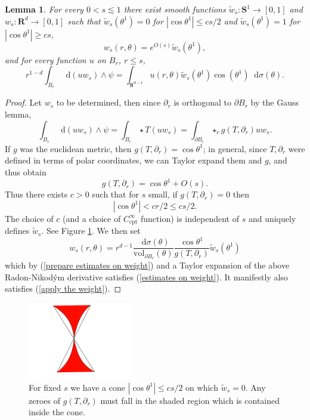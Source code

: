 \documentclass[reqno,12pt,letterpaper]{amsart}
\newcommand{\RR}{\mathbf{R}}
\newcommand{\Sph}{\mathbf S}
\newcommand*\dif{\mathop{}\!\mathrm{d}}
\newcommand{\vol}{\mathrm{vol}}
\newcommand{\cpt}{\mathrm{cpt}}
\newtheorem{lemma}[theorem]{Lemma}
\theoremstyle{definition}
\numberwithin{equation}{section}
\begin{document}
\begin{lemma}\label{monotone weight}
For every $0 < s \lesssim 1$ there exist smooth functions $\tilde w_s: \Sph^1 \to [0, 1]$ and $w_s: \RR^d \to [0, 1]$ such that $\tilde w_s(\theta^1) = 0$ for $|\cos \theta^1| \leq cs/2$ and $\tilde w_s(\theta^1) = 1$ for $|\cos \theta^1| \geq cs$,
\begin{equation}\label{estimates on weight}
w_s(r, \theta) = e^{O(s)} \tilde w_s(\theta^1),
\end{equation}
and for every function $u$ on $B_r$, $r \leq s$,
\begin{equation}\label{apply the weight}
r^{1 - d} \int_{B_r} \dif(uw_s) \wedge \psi = \int_{\Sph^{d - 1}} u(r, \theta) \tilde w_s(\theta^1) \cos(\theta^1) \dif \sigma(\theta).
\end{equation}
\end{lemma}
\begin{proof}
Let $w_s$ to be determined, then since $\partial_r$ is orthogonal to $\partial B_r$ by the Gauss lemma,
$$\int_{B_r} \dif(uw_s) \wedge \psi = \int_{B_r} \star T(uw_s) = \int_{\partial B_r} \star_r g(T, \partial_r) uw_s.$$
If $g$ was the euclidean metric, then $g(T, \partial_r) = \cos \theta^1$; in general, since $T, \partial_r$ were defined in terms of polar coordinates, we can Taylor expand them and $g$, and thus obtain
\begin{equation}\label{prepare estimates on weight}
g(T, \partial_r) = \cos \theta^1 + O(s).
\end{equation}
Thus there exists $c > 0$ such that for $s$ small, if $g(T, \partial_r) = 0$ then
$$|\cos \theta^1| < cr/2 \leq cs/2.$$
The choice of $c$ (and a choice of $C^\infty_\cpt$ function) is independent of $s$ and uniquely defines $\tilde w_s$. See Figure \ref{cutoff diagram}.
We then set 
$$w_s(r, \theta) = r^{d - 1} \frac{\dif \sigma(\theta)}{\vol_{\partial B_r}(\theta)} \frac{\cos \theta^1}{g(T, \partial_r)} \tilde w_s(\theta^1)$$
which by (\ref{prepare estimates on weight}) and a Taylor expansion of the above Radon-Nikod\'ym derivative satisfies (\ref{estimates on weight}).
It manifestly also satisfies (\ref{apply the weight}).
\end{proof}

\begin{figure}[ht]
\caption{For fixed $s$ we have a cone $|\cos \theta^1| \leq cs/2$ on which $\tilde w_s = 0$.
Any zeroes of $g(T, \partial_r)$ must fall in the shaded region which is contained inside the cone.
\label{cutoff diagram}}
\includegraphics[width=0.4\textwidth]{cutoff_cone}
\end{figure}
\end{document}
